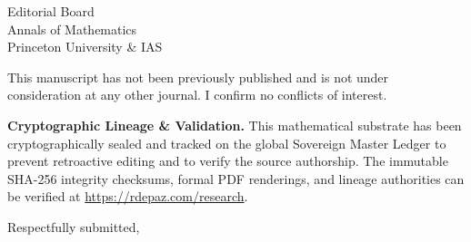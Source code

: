 \documentclass[12pt, a4paper]{letter}
\begin{document}
\begin{letter}{Editorial Board \\ Annals of Mathematics \\ Princeton University \& IAS}
\medskip

This manuscript has not been previously published and is not under consideration
at any other journal. I confirm no conflicts of interest.

\textbf{Cryptographic Lineage \& Validation.} This mathematical substrate has been cryptographically sealed and tracked on the global Sovereign Master Ledger to prevent retroactive editing and to verify the source authorship. The immutable SHA-256 integrity checksums, formal PDF renderings, and lineage authorities can be verified at \url{https://rdepaz.com/research}.

\medskip

\closing{Respectfully submitted,}
\end{letter}
\end{document}
